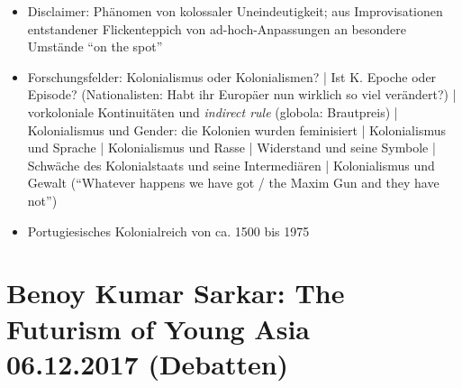 \documentclass[emulatestandardclasses]{scrartcl}
\begin{document}
\begin{itemize}
  \item Disclaimer: Phänomen von kolossaler Uneindeutigkeit; aus Improvisationen entstandener Flickenteppich von ad-hoch-Anpassungen an besondere Umstände "`on the spot"'
  \item Forschungsfelder: Kolonialismus oder Kolonialismen? | Ist K. Epoche oder Episode? (Nationalisten: Habt ihr Europäer nun wirklich so viel verändert?) | vorkoloniale Kontinuitäten und \emph{indirect rule} (globola: Brautpreis) | Kolonialismus und Gender: die Kolonien wurden feminisiert | Kolonialismus und Sprache | Kolonialismus und Rasse | Widerstand und seine Symbole | Schwäche des Kolonialstaats und seine Intermediären | Kolonialismus und Gewalt ("`Whatever happens we have got / the Maxim Gun and they have not"')
  \item Portugiesisches Kolonialreich von ca. 1500 bis 1975
\end{itemize}

\section{Benoy Kumar Sarkar: The Futurism of Young Asia\\06.12.2017 (Debatten)}
\end{document}
